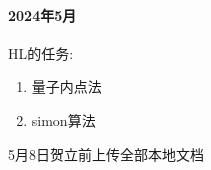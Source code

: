 \paragraph{2024年5月}HL的任务:
\begin{enumerate}
    \item 量子内点法
    \item simon算法
\end{enumerate}

5月8日贺立前上传全部本地文档